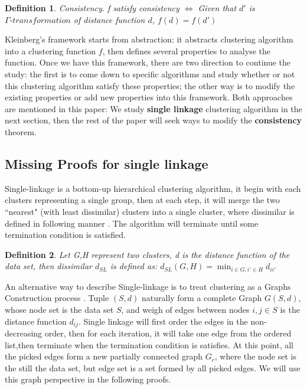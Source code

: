\documentclass{uonmathreport}
\newtheorem{definition}{Definition}[section]
\begin{document}
\begin{definition}
Consistency. f satisfy consistency $\iff$ Given that $d'$ is $\Gamma \textit{-transformation}$ of distance function $d$, $f(d) = f(d')$
\end{definition}

Kleinberg's framework starts from abstraction: it abstracts clustering algorithm into a clustering function $f$, then defines several properties to analyse the function. Once we have this framework, there are two direction to continue the study: the first is to come down to specific algorithms and study whether or not this clustering algorithm satisfy these properties; the other way is to modify the existing properties or add new properties into this framework. Both approaches are mentioned in this paper: We study \textbf{single linkage} clustering algorithm in the next section, then the rest of the paper will seek ways to modify the \textbf{consistency} theorem.
\subsection{Missing Proofs for single linkage} \label{subsec:Single-linkage}

Single-linkage is a bottom-up hierarchical clustering algorithm, it begin with each clusters representing a single group, then at each step, it will merge the two ``nearest" (with least dissimilar) clusters into a single cluster, where dissimilar is defined in following manner \cite{esl}. The algorithm will terminate until some termination condition is satisfied.
\begin{definition}
Let G,H represent two clusters, d is the distance function of the data set, then dissimilar $d_{SL}$ is defined as:
$d_{SL}(G,H) = \min_{i\in G,i'\in H}d_{ii'} $
\end{definition}

An alternative way to describe Single-linkage is to treat clustering as a Graphs Construction process \cite{christopher2008introduction}. Tuple $(S,d)$ naturally form a complete Graph $G(S,d)$, whose node set is  the data set $S$, and weigh of edges between nodes $i,j \in S$ is the distance function $d_{ij}$. Single linkage will first order the edges in the non-decreasing order, then for each iteration, it will take one edge from the ordered list,then terminate when the termination condition is satisfies. At this point, all the picked edges form a new partially connected graph $G_{c}$, where the node set is the still the data set, but edge set is a set formed by all picked edges. We will use this graph perspective in the following proofs.
\end{document}
